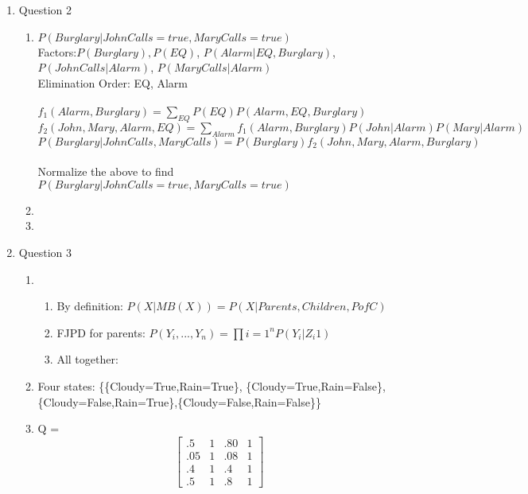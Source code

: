 \documentclass[11pt]{article}
\begin{document}
\begin{enumerate}
\begin{enumerate}
\end{enumerate}

\item Question 2
\begin{enumerate}
\item $P(Burglary|JohnCalls = true, MaryCalls = true)$
\\Factors:$ P(Burglary), P(EQ)$, $P(Alarm|EQ, Burglary)$,$ P(JohnCalls|Alarm)$, $P(MaryCalls|Alarm)$
\\Elimination Order: EQ, Alarm
\\
\\$f_{1}(Alarm, Burglary) = \sum_{EQ} P(EQ) P(Alarm, EQ, Burglary)$
\\$f_{2}(John, Mary, Alarm, EQ) = \sum_{Alarm}f_{1}(Alarm,Burglary)P(John|Alarm)P(Mary|Alarm)$
\\$P(Burglary|JohnCalls,MaryCalls) = P(Burglary)f_{2}(John, Mary, Alarm, Burglary)$
\\
\\Normalize the above to find $P(Burglary|JohnCalls = true, MaryCalls = true)$
\item
\item
\end {enumerate}

\item Question 3
\begin{enumerate}
\item
\begin{enumerate}
\item By definition: $P(X|MB(X)) = P(X|Parents,Children,PofC) $
\item FJPD for parents: $P(Y_i, ..., Y_n) = \prod{i = 1}^{n} P(Y_i | Z_{i}1)$ 
\item All together: 
\end{enumerate}
\item Four states: \{\{Cloudy=True,Rain=True\}, \{Cloudy=True,Rain=False\}, \\
 \{Cloudy=False,Rain=True\},\{Cloudy=False,Rain=False\}\}
\item Q = \[
\begin{bmatrix}
	.5 & 1 & .80 & 1 \\
	.05 & 1 & .08 & 1 \\
	.4 & 1 & .4 & 1 \\
	.5 & 1 & .8 & 1
\end{bmatrix}
\]
\end{enumerate}


\end{enumerate}
\end{document}
